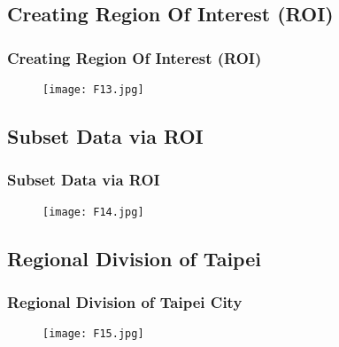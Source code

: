 \documentclass[pdflatex,compress,8pt,
	xcolor={dvipsnames,dvipsnames,svgnames,x11names,table},
	hyperref={colorlinks = true,breaklinks = true, urlcolor = NavyBlue, breaklinks = true}]{beamer}
\begin{document}
\subsection{Creating Region Of Interest (ROI)}
\begin{frame}\frametitle{Creating Region Of Interest (ROI)}
\begin{figure}[H]
	\centering
		\texttt{[image: F13.jpg]}
\end{figure}
\end{frame}

\subsection{Subset Data via ROI}
\begin{frame}\frametitle{ Subset Data via ROI}
\begin{figure}[H]
	\centering
		\texttt{[image: F14.jpg]}
\end{figure}
\end{frame}

\subsection{Regional Division of Taipei}
\begin{frame}\frametitle{Regional Division of Taipei City}
\begin{figure}[H]
	\centering
		\texttt{[image: F15.jpg]}
\end{figure}
\end{frame}
\end{document}
